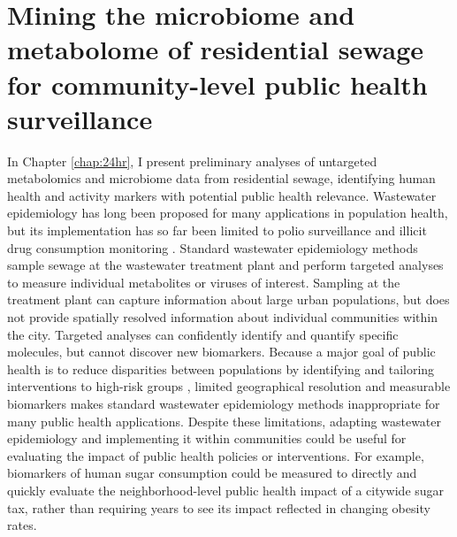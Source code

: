 \section{Mining the microbiome and metabolome of residential sewage for community-level public health surveillance}

In Chapter \ref{chap:24hr}, I present preliminary analyses of untargeted metabolomics and microbiome data from residential sewage, identifying human health and activity markers with potential public health relevance.
Wastewater epidemiology has long been proposed for many applications in population health, but its implementation has so far been limited to polio surveillance \cite{polio} and illicit drug consumption monitoring \cite{Subedi2014,Ort2014}.
Standard wastewater epidemiology methods sample sewage at the wastewater treatment plant and perform targeted analyses to measure individual metabolites or viruses of interest.
Sampling at the treatment plant can capture information about large urban populations, but does not provide spatially resolved information about individual communities within the city.
Targeted analyses can confidently identify and quantify specific molecules, but cannot discover new biomarkers.
Because a major goal of public health is to reduce disparities between populations by identifying and tailoring interventions to high-risk groups \cite{Ramaswami2018,Weeramanthri2018,Khoury2016}, limited geographical resolution and measurable biomarkers makes standard wastewater epidemiology methods inappropriate for many public health applications.
Despite these limitations, adapting wastewater epidemiology and implementing it within communities could be useful for evaluating the impact of public health policies or interventions.
For example, biomarkers of human sugar consumption could be measured to directly and quickly evaluate the neighborhood-level public health impact of a citywide sugar tax, rather than requiring years to see its impact reflected in changing obesity rates.

